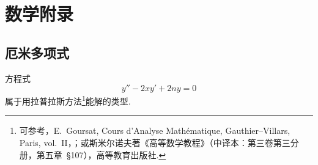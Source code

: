 \chapter*{数学附录}
\setcounter{section}{0}
\renewcommand{\thesection}{\alph{section}}
\renewcommand{\theequation}{\alph{section}.\arabic{equation}}

\section{厄米多项式}

方程式
\begin{equation}
  y''-2xy'+2ny=0
\end{equation}
属于用拉普拉斯方法\footnote{可参考，E.~Goursat, Cours d'Analyse Math\'ematique, Gauthier--Villars, Paris, vol.~II，；或斯米尔诺夫著《高等数学教程》（中译本：第三卷第三分册，第五章~§107），高等教育出版社.}能解的类型.

